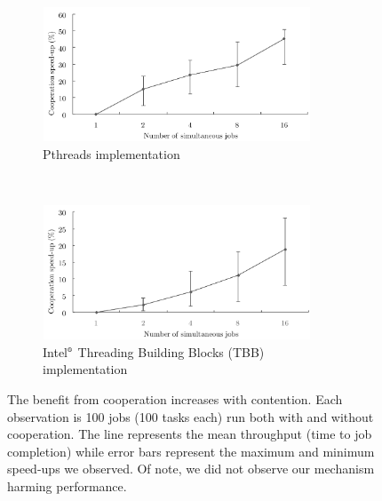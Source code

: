 \begin{figure}[t!]
    \centering
    \begin{subfigure}[t]{0.5\textwidth}
        \centering
        \includegraphics[width=8cm,height=4cm]{fig/randomized-pthreads.pdf}
        \caption{Pthreads implementation}
        \label{fig:pthread}
    \end{subfigure}%
    ~ 
    \begin{subfigure}[t]{0.5\textwidth}
        \centering
        \includegraphics[width=8cm,height=4cm]{fig/randomized-tbb.pdf}
        \caption{Intel$^{\mbox{\tiny\textregistered}}$ Threading Building Blocks (TBB) implementation}
        \label{fig:tbb}
    \end{subfigure}
    \label{fig:randomized}
    \caption{The benefit from cooperation increases with contention. Each observation is 100 jobs (100 tasks each) run both with and without cooperation. The line represents the mean throughput (time to job completion) while error bars represent the maximum and minimum speed-ups we observed. Of note, we did not observe our mechanism harming performance.}
\end{figure}